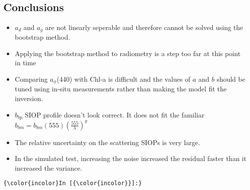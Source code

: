 \documentclass{article}
\begin{document}
    \begin{center}
    \end{center}
    { \hspace*{\fill} \\}
    
    \subsection{}\label{section}

\subsection{Conclusions}\label{conclusions}

\begin{itemize}
\item
  $a_d$ and $a_g$ are not linearly seperable and therefore cannot be
  solved using the bootstrap method.
\item
  Applying the bootstrap method to radiometry is a step too far at this
  point in time
\item
  Comparing $a_{\phi}$(440) with Chl-a is difficult and the values of
  $a$ and $b$ should be tuned using in-situ measurements rather than
  making the model fit the inversion.
\item
  $b_{bp}$ SIOP profile doesn't look correct. It does not fit the
  familiar $b_{bm} = b_{bm}(555)(\frac{555}{\lambda})^y$
\item
  The relative uncertainty on the scattering SIOPs is very large.
\item
  In the simulated test, increasing the noise increased the residual
  faster than it increased the variance.
\end{itemize}

    \begin{Verbatim}[commandchars=\\\{\}]
{\color{incolor}In [{\color{incolor}}]:} 
\end{Verbatim}


    
    
    
    
\end{document}
